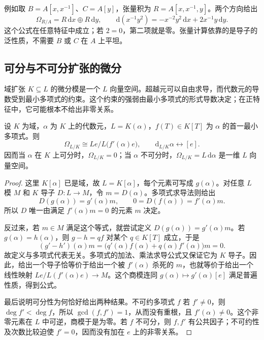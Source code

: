 例如取 \(B=A[x,x^{-1}]\)、\(C=A[y]\)，张量积为 \(R=A[x,x^{-1},y]\)。两个方向给出
\[
	\Omega_{R/A}=R\,\mathrm{d}x\oplus R\,\mathrm{d}y,\qquad
	\mathrm{d}(x^{-1}y^2)
	=-x^{-2}y^2\,\mathrm{d}x+2x^{-1}y\,\mathrm{d}y.
\]
这个公式在任意特征中成立；若 \(2=0\)，第二项就是零。张量计算依靠的是导子的泛性质，不需要 \(B\) 或 \(C\) 在 \(A\) 上平坦。

\subsection{可分与不可分扩张的微分}
\label{g5:subsec:0501:04}

域扩张 \(K\subseteq L\) 的微分模是一个 \(L\) 向量空间。超越元可以自由求导，而代数元的导数受到最小多项式的约束。这个约束的强弱由最小多项式的形式导数决定；在正特征中，它可能根本不给出非零关系。

\begin{proposition}\label{g5:prop:simple-field-differentials}
	设 \(K\) 为域，\(\alpha\) 为 \(K\) 上的代数元，\(L=K(\alpha)\)，\(f(T)\in K[T]\) 为 \(\alpha\) 的首一最小多项式。则
	\[
		\Omega_{L/K}\cong
		L e\big/L\bigl(f'(\alpha)e\bigr),
		\qquad \mathrm{d}_{L/K}\alpha\longleftrightarrow[e].
	\]
	因而当 \(\alpha\) 在 \(K\) 上可分时，\(\Omega_{L/K}=0\)；当 \(\alpha\) 不可分时，\(\Omega_{L/K}=L\,\mathrm{d}\alpha\) 是一维 \(L\) 向量空间。
\end{proposition}
\begin{proof}
	这里 \(K[\alpha]\) 已是域，故 \(L=K[\alpha]\)，每个元素可写成 \(g(\alpha)\)。对任意 \(L\) 模 \(M\) 和 \(K\) 导子 \(D:L\to M\)，令 \(m=D(\alpha)\)。多项式求导法则给出
	\[
		D(g(\alpha))=g'(\alpha)m,\qquad
		0=D(f(\alpha))=f'(\alpha)m.
	\]
	所以 \(D\) 唯一由满足 \(f'(\alpha)m=0\) 的元素 \(m\) 决定。

	反过来，若 \(m\in M\) 满足这个等式，就尝试定义
	\(D(g(\alpha))=g'(\alpha)m\)。若 \(g(\alpha)=h(\alpha)\)，则 \(g-h=qf\) 对某个 \(q\in K[T]\) 成立，于是
	\[
		(g'-h')(\alpha)m
		=\bigl(q'(\alpha)f(\alpha)+q(\alpha)f'(\alpha)\bigr)m=0.
	\]
	故定义与多项式代表无关。多项式的加法、乘法求导公式又保证它为 \(K\) 导子。因此，给出一个导子恰等价于给出一个被 \(f'(\alpha)\) 杀死的 \(m\)，也就等价于给出一个线性映射
	\(Le/L(f'(\alpha)e)\to M\)。这个商模连同 \(g(\alpha)\mapsto g'(\alpha)[e]\) 满足普遍性质，得到公式。

	最后说明可分性为何恰好给出两种结果。不可约多项式 \(f\) 若 \(f'\ne0\)，则 \(\deg f'<\deg f\)，所以 \(\gcd(f,f')=1\)，从而没有重根，且 \(f'(\alpha)\ne0\)。这个非零元素在 \(L\) 中可逆，商模于是为零。若 \(f\) 不可分，则 \(f,f'\) 有公共因子；不可约性及次数比较迫使 \(f'=0\)，因而没有加在 \(e\) 上的非零关系。
\end{proof}

